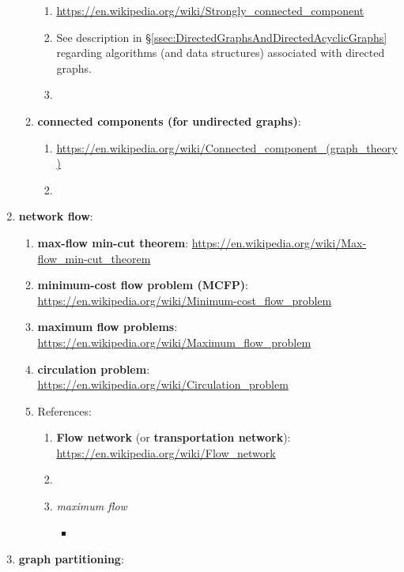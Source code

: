 \begin{enumerate}
\begin{enumerate}
		\begin{enumerate} \itemsep -2pt
		\item \url{https://en.wikipedia.org/wiki/Strongly_connected_component}
		\item See description in \S\ref{ssec:DirectedGraphsAndDirectedAcyclicGraphs} regarding algorithms (and data structures) associated with directed graphs.
		\item \cite[\S B.4, pp. 1170-1171]{Cormen2009}
		\end{enumerate}
	\item {\bf connected components (for undirected graphs)}: \vspace{-0.2cm}
		\begin{enumerate} \itemsep -2pt
		\item \url{https://en.wikipedia.org/wiki/Connected_component_(graph_theory)}
		\item \cite[\S B.4, pp. 1170]{Cormen2009}
		\end{enumerate}
	\end{enumerate}
\item {\bf network flow}: \vspace{-0.3cm}
	\begin{enumerate} \itemsep -2pt
	\item {\bf max-flow min-cut theorem}: \url{https://en.wikipedia.org/wiki/Max-flow_min-cut_theorem}
	\item {\bf minimum-cost flow problem (MCFP)}: \url{https://en.wikipedia.org/wiki/Minimum-cost_flow_problem}
	\item {\bf maximum flow problems}: \url{https://en.wikipedia.org/wiki/Maximum_flow_problem}
	\item {\bf circulation problem}: \url{https://en.wikipedia.org/wiki/Circulation_problem}
	\item References: \vspace{-0.2cm}
		\begin{enumerate} \itemsep -2pt
		\item {\bf Flow network} (or {\bf transportation network}): \url{https://en.wikipedia.org/wiki/Flow_network}
		\item 
		\item {\it maximum flow}
			\begin{itemize}
			\item \cite[\S26]{Cormen2009}
			\end{itemize}
		\end{enumerate}
	\end{enumerate}
\item {\bf graph partitioning}: \vspace{-0.3cm}

\end{enumerate}
